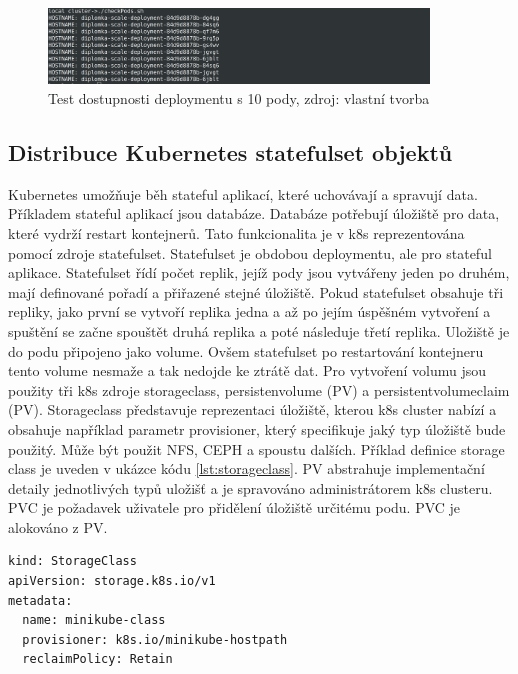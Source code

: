 \begin{figure}[H]
  \begin{centering}
    
	  \includegraphics[width=0.9\textwidth]{images/scale3.png}
    \par
	  \caption{Test dostupnosti deploymentu s 10 pody\label{fig:scale3},  zdroj: vlastní tvorba}
    \end{centering}
\end{figure}

\subsection{Distribuce Kubernetes statefulset objektů}
Kubernetes umožňuje běh stateful aplikací, které uchovávají a spravují data. Příkladem stateful aplikací jsou databáze. Databáze potřebují úložiště pro data, které vydrží restart kontejnerů. Tato funkcionalita je v k8s reprezentována pomocí zdroje statefulset. Statefulset je obdobou deploymentu, ale pro stateful aplikace. Statefulset řídí počet replik, jejíž pody jsou vytvářeny jeden po druhém, mají definované pořadí a přiřazené stejné úložiště. Pokud statefulset obsahuje tři repliky, jako první se vytvoří replika jedna a až po jejím úspěšném vytvoření a spuštění se začne spouštět druhá replika a poté následuje třetí replika. Uložiště je do podu připojeno jako volume. Ovšem statefulset po restartování kontejneru tento volume nesmaže a tak nedojde ke ztrátě dat. Pro vytvoření volumu jsou použity tři k8s zdroje storageclass, persistenvolume (PV) a persistentvolumeclaim (PV). Storageclass představuje reprezentaci úložiště, kterou k8s cluster nabízí a obsahuje například parametr provisioner, který specifikuje jaký typ úložiště bude použitý. Může být použit NFS, CEPH a spoustu dalších. Příklad definice storage class je uveden v ukázce kódu \ref{lst:storageclass}. PV abstrahuje implementační detaily jednotlivých typů uložišť a je spravováno administrátorem k8s clusteru. PVC je požadavek uživatele pro přidělení úložiště určitému podu. PVC je alokováno z PV. 

\begin{lstlisting}[caption={StorageClass definice pro minikube cluster},label=lst:storageclass]
kind: StorageClass
apiVersion: storage.k8s.io/v1
metadata:
  name: minikube-class
  provisioner: k8s.io/minikube-hostpath
  reclaimPolicy: Retain
\end{lstlisting}


